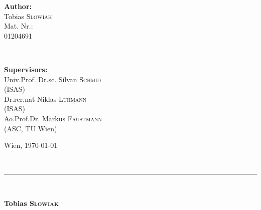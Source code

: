\begin{titlepage}
    
    \begin{minipage}[t]{0.48\textwidth}
    \begin{flushleft} \large
    \textbf{Author:}\\ 
    Tobias \textsc{Slowiak} \\[0.25cm] 
    \small Mat. Nr.: \\
    01204691 \\[0.25cm]


    \end{flushleft}
    \end{minipage}
    ~
    \begin{minipage}[t]{0.48\textwidth}
    \begin{flushright} \large
    \textbf{Supervisors:} \\ 
    Univ.Prof. Dr.sc. Silvan \textsc{Schmid}\\
    \small{(ISAS)} \\[0.25cm]
    \large Dr.rer.nat Niklas \textsc{Luhmann}\\
    \small{(ISAS)} \\[0.25cm]
    \large Ao.Prof.Dr. Markus \textsc{Faustmann}\\
    \small{(ASC, TU Wien)}\\[0.25cm]
    \end{flushright}
    \end{minipage}
    
    \vfill
    
    
    \begin{minipage}[t]{0.48\textwidth}
        \begin{flushleft}
            {\large Wien, \today \par} 
        \end{flushleft}
    \end{minipage}
    ~
    \begin{minipage}[t]{0.48\textwidth}
        \begin{flushright}
            \null
            \rule{6cm}{0.4pt} \\ 
            {\large \textbf{Tobias \textsc{Slowiak}} \par}
        \end{flushright}
    \end{minipage}

    

\end{titlepage}
